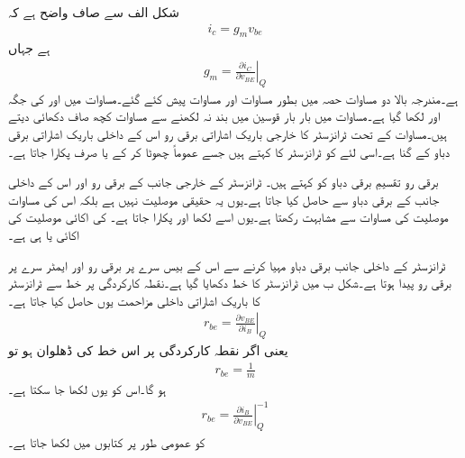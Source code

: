 شکل   الف سے صاف واضح ہے کہ
\begin{align}\label{مساوات_ٹرانزسٹر_رو_بذریعہ_موصلیت}
i_c = g_m v_{be}
\end{align}
ہے  جہاں
\begin{align} \label{مساوات_ٹرانزسٹر_نکتہ_مائل_پر_موصلیت_نما}
g_m = \left. \frac{\partial i_C}{\partial v_{BE}}\right |_Q
\end{align}
 ہے۔مندرجہ بالا دو مساوات حصہ  میں بطور مساوات   اور مساوات   پیش کئے گئے۔مساوات   میں  اور  کی جگہ  اور  لکھا گیا ہے۔مساوات میں بار بار قوسین میں بند   نہ لکھنے سے مساوات کچھ صاف دکھائی دیتے ہیں۔مساوات   کے تحت ٹرانزسٹر کا خارجی باریک اشاراتی برقی رو  اس کے داخلی باریک اشاراتی برقی دباو  کے  گنا ہے۔اسی لئے  کو ٹرانزسٹر کا   کہتے ہیں جسے عموماً چھوٹا کر کے  یا صرف   پکارا جاتا ہے۔

برقی رو تقسیمِ برقی دباو کو  کہتے ہیں۔ ٹرانزسٹر کے خارجی جانب  کے برقی رو اور اس کے داخلی جانب کے برقی دباو سے حاصل کیا جاتا ہے۔یوں یہ حقیقی موصلیت نہیں ہے بلکہ اس کی مساوات موصلیت کی مساوات سے مشابہت رکھتا ہے۔یوں اسے  لکھا اور  پکارا جاتا ہے۔ کی اکائی موصلیت کی اکائی  یا  ہی ہے۔


ٹرانزسٹر کے داخلی جانب برقی دباو  مہیا کرنے سے اس کے بیس سرے پر برقی رو  اور ایمٹر سرے پر برقی رو  پیدا ہوتا ہے۔شکل   ب میں ٹرانزسٹر کا  خط دکھایا گیا ہے۔نقطہ کارکردگی پر  خط سے ٹرانزسٹر کا باریک اشاراتی داخلی مزاحمت  یوں حاصل کیا جاتا ہے۔
\begin{align}
r_{be}=\left. \frac{\partial v_{BE}}{\partial i_B} \right |_Q
\end{align}
یعنی اگر نقطہ کارکردگی پر اس خط کی ڈھلوان  ہو تو 
\begin{align*}
r_{be}=\frac{1}{m}
\end{align*}
ہو گا۔اس کو یوں لکھا جا سکتا ہے۔
\begin{align}
r_{be}=\left. \frac{\partial i_B}{\partial v_{BE}}  \right |_Q^{-1}
\end{align}
 کو عمومی طور پر کتابوں میں  لکھا جاتا ہے۔

